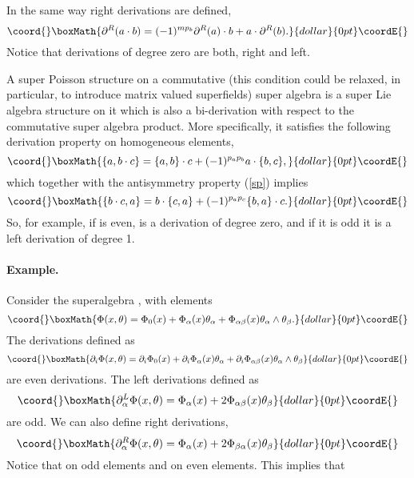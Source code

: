 \documentclass[a4paper,12pt]{article}
\begin{document}
In the same way right derivations are defined,
$$\coord{}\boxMath{
\partial^R(a\cdot b)=(-1)^{mp_b}\partial^R(a)\cdot b +a\cdot\partial^R(b).
}{dollar}{0pt}\coordE{}$$
Notice that  derivations of degree zero are both, right and left.


A super Poisson structure on a commutative (this condition could be
relaxed,
 in particular, to introduce matrix valued superfields) super algebra is a
 super Lie algebra structure
 \myHighlight{$\{\;,\;\}$}\coordHE{} on it  which is also a bi-derivation with respect to the
 commutative super algebra product. More specifically, it satisfies the
following derivation property on homogeneous elements,
$$\coord{}\boxMath{
\{a,b\cdot c\}=\{a,b\}\cdot c+(-1)^{p_ap_b}a\cdot \{b,c\},
}{dollar}{0pt}\coordE{}$$
which together with the antisymmetry property (\ref{sp}) implies
$$\coord{}\boxMath{
\{b\cdot c,a\}=b\cdot \{c,a\}+(-1)^{p_ap_c}\{b,a\}\cdot c.
}{dollar}{0pt}\coordE{}$$
So, for example, if \coordHE{} is even, \coordHE{} is a derivation of
degree zero, and if it is odd it is a left derivation of degree 1. 


 
\paragraph{Example.} Consider the superalgebra   \coordHE{}, with 
elements
$$\coord{}\boxMath{
\Phi(x,\theta)=\Phi_0(x)+\Phi_{\alpha}(x)\theta_\alpha+
\Phi_{\alpha\beta}(x)\theta_\alpha\wedge\theta_\beta.
}{dollar}{0pt}\coordE{}$$
 The derivations \coordHE{} defined as
$$\coord{}\boxMath{
\partial_i\Phi(x,\theta)=\partial_i\Phi_0(x)+\partial_i\Phi_{\alpha}(x)
\theta_\alpha+
\partial_i\Phi_{\alpha\beta}(x)\theta_\alpha\wedge\theta_\beta
}{dollar}{0pt}\coordE{}$$
 are  even derivations. The left derivations \coordHE{} defined
as
$$\coord{}\boxMath{
 \partial^L_\alpha\Phi(x,\theta)=\Phi_{\alpha}(x)+
2\Phi_{\alpha\beta}(x)\theta_\beta
}{dollar}{0pt}\coordE{}$$
are odd. We can also define right derivations,
$$\coord{}\boxMath{
 \partial^R_\alpha\Phi(x,\theta)=\Phi_{\alpha}(x)+
2\Phi_{\beta\alpha}(x)\theta_\beta
}{dollar}{0pt}\coordE{}$$
Notice that \coordHE{} on odd elements and
\coordHE{} on even elements. This implies
that \coordHE{}
\end{document}
